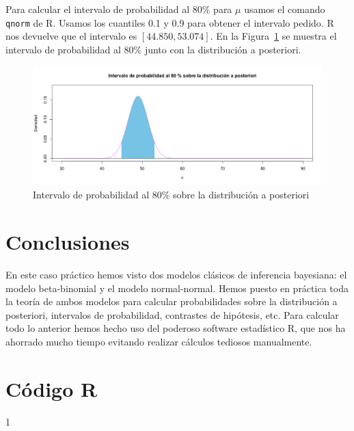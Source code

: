 \documentclass[12pt,a4paper,twoside,openright,titlepage,final]{article}
\begin{document}
Para calcular el intervalo de probabilidad al 80\% para $\mu$ usamos el comando \texttt{qnorm} de R. Usamos los cuantiles 0.1 y 0.9 para obtener el intervalo pedido. R nos devuelve que el intervalo es $[44.850, 53.074]$. En la Figura~\ref{fig:intervalo_probabilidad_normal} se muestra el intervalo de probabilidad al 80\% junto con la distribución a posteriori.

\begin{figure}[tbph!]
\centering
\includegraphics[width=0.9\linewidth]{./imagenes/intervalo_probabilidad_normal}
\caption{Intervalo de probabilidad al 80\% sobre la distribución a posteriori}
\label{fig:intervalo_probabilidad_normal}
\end{figure}

\section{Conclusiones}

En este caso práctico hemos visto dos modelos clásicos de inferencia bayesiana: el modelo beta-binomial y el modelo normal-normal. Hemos puesto en práctica toda la teoría de ambos modelos para calcular probabilidades sobre la distribución a posteriori, intervalos de probabilidad, contrastes de hipótesis, etc. Para calcular todo lo anterior hemos hecho uso del poderoso software estadístico R, que nos ha ahorrado mucho tiempo evitando realizar cálculos tediosos manualmente. 

\newpage

\section{Código R}
1

\end{document}

